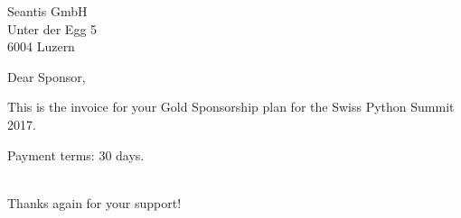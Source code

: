 \documentclass[SN,11pt,enlargefirstpage=true,sps]{scrlttr2}
\begin{document}
\begin{letter}{Seantis GmbH\\Unter der Egg 5\\6004 Luzern}

  \opening{Dear Sponsor,}

  This is the invoice for your Gold Sponsorship plan for the Swiss Python Summit 2017.

  \begin{invoice}{0}%
  \end{invoice}

  Payment terms: 30 days.

  \closing{\\Thanks again for your support!}

\end{letter}
\end{document}
